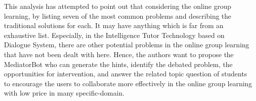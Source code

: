 \documentclass[letterpaper%
, twoside%
, 12pt%
,these%
, english%
,creativecommons,hyperref, withAlgo2e %
]{thETS}
\begin{document}
This analysis has attempted to point out that considering the online group learning, by listing seven of the most common problems and describing the traditional solutions for each. It may have anything which is far from an exhaustive list. Especially, in the Intelligence Tutor Technology based on Dialogue System, there are other potential problems in the online group learning that have not been dealt with here. Hence, the authors want to propose the MediatorBot who can generate the hints, identify the debated problem, the opportunities for intervention, and answer the related topic question of students to encourage the users to collaborate more effectively in the online group learning with low price in many specific-domain. 

\end{document}
